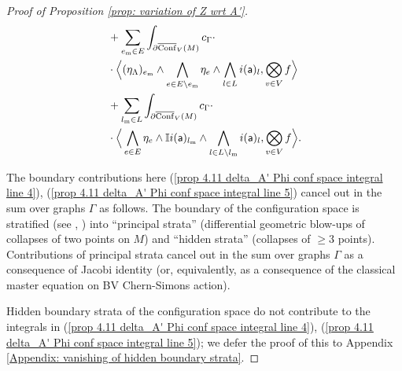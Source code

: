 \documentclass[11pt,a4paper]{amsart}
\theoremstyle{plain} %
\theoremstyle{definition}
\theoremstyle{remark}
\newcommand{\sfa}{\mathsf{a}}
\newcommand{\mm}{\mathrm{m}}
\newcommand{\Conf}[1][V]{\overline{\mathrm{Conf}}_#1(M)}
\newcommand{\II}{\mathbb{I}}
\begin{document}
{\begin{proof}[%
Proof of Proposition \ref{prop: variation of Z wrt A'}]
\begin{align}
    \label{prop 4.11 delta_A' Phi conf space integral line 4}
    &+\sum_{e_\mm\in E} \int_{\partial \Conf} c_\Gamma \cdot \\
    \notag
    &\cdot \Big\langle 
    (\eta_\Lambda)_{e_\mm}\wedge\bigwedge_{e\in E\setminus e_\mm}\eta_e\wedge \bigwedge_{l\in L}i(\sfa)_l,\bigotimes_{v\in V} f
    \Big\rangle \\
    \label{prop 4.11 delta_A' Phi conf space integral line 5}
    &+ \sum_{l_\mm\in L} \int_{\partial \Conf} c_\Gamma \cdot \\
    \notag&\cdot \Big\langle 
    \bigwedge_{e\in E}\eta_e\wedge \II i(\sfa)_{l_\mm} \wedge\bigwedge_{l\in L\setminus l_\mm}i(\sfa)_l,\bigotimes_{v\in V} f
    \Big\rangle .
\end{align}

The boundary contributions here (\ref{prop 4.11 delta_A' Phi conf space integral line 4}), (\ref{prop 4.11 delta_A' Phi conf space integral line 5}) cancel out in the sum over graphs $\Gamma$ as follows. The boundary of the configuration space is stratified (see \cite{Axelrod1994}, \cite{Cattaneo2008}) into ``principal strata'' (differential geometric blow-ups of collapses of two points on $M$) and ``hidden strata'' (collapses of $\geq 3$ points). Contributions of principal strata cancel out in the sum over graphs $\Gamma$ as a consequence of Jacobi identity  (or, equivalently, as a consequence of the classical master equation on BV Chern-Simons action).

Hidden boundary strata of the configuration space do not contribute to the integrals in (\ref{prop 4.11 delta_A' Phi conf space integral line 4}), (\ref{prop 4.11 delta_A' Phi conf space integral line 5}); we defer the proof of this to Appendix \ref{Appendix: vanishing of hidden boundary strata}.



\end{proof}}
\end{document}
